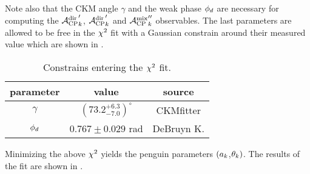 \noindent Note also that the CKM angle $\gamma$ and the weak phase $\phi_{d}$ are necessary for computing the ${\mathcal{A}_{\rm CP}^{\rm dir}}'_k$,
${\mathcal{A}_{\rm CP}^{\rm dir}}'_k$ and ${\mathcal{A}_{\rm CP}^{\rm mix}}''_k$ observables. The last parameters are allowed to be free in the
$\chi^2$ fit with a Gaussian constrain around their measured value which are shown in .

\begin{table}[!h]
  \center
  \begin{tabular}{c c c}
    \hline
    parameter & value & source \\
    \hline
    $\gamma$      & $\left(73.2_{-7.0}^{+6.3}\right)^{\circ}$ & CKMfitter \cite{Charles:2015gya} \\
    $\phi_{d}$       & $0.767 \pm 0.029$ rad & DeBruyn K.\cite{DeBruyn-thesis} \\
    \hline
  \end{tabular}
  \caption{\small Constrains entering the $\chi^2$ fit.}
  \label{chi2_fit_constrains}
\end{table}

\noindent Minimizing the above $\chi^2$ yields the penguin parameters $(a_k$,$\theta_k)$.
The results of the fit are shown in .
